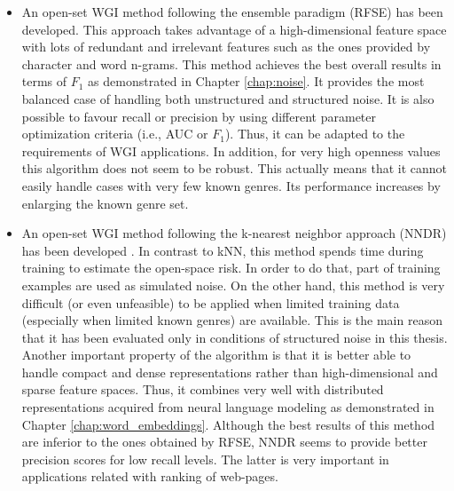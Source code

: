 \begin{itemize}
    \item An open-set WGI method following the ensemble paradigm (RFSE) has been developed. This approach takes advantage of a high-dimensional feature space with lots of redundant and irrelevant features such as the ones provided by character and word n-grams. This method achieves the best overall results in terms of $F_1$ as demonstrated in Chapter \ref{chap:noise}. It provides the most balanced case of handling both unstructured and structured noise. It is also possible to favour recall or precision by using different parameter optimization criteria (i.e., AUC or $F_1$). Thus, it can be adapted to the requirements of WGI applications. In addition, for very high openness values this algorithm does not seem to be robust. This actually means that it cannot easily handle cases with very few known genres. Its performance increases by enlarging the known genre set. 
    \item An open-set WGI method following the k-nearest neighbor approach (NNDR) has been developed . In contrast to kNN, this method spends time during training to estimate the open-space risk. In order to do that, part of training examples are used as simulated noise. On the other hand, this method is very difficult (or even unfeasible) to be applied when limited training data (especially when limited known genres) are available. This is the main reason that it has been evaluated only in conditions of structured noise in this thesis. Another important property of the algorithm is that it is better able to handle compact and dense representations rather than high-dimensional and sparse feature spaces. Thus, it combines very well with distributed representations acquired from neural language modeling as demonstrated in Chapter \ref{chap:word_embeddings}. Although the best results of this method are inferior to the ones obtained by RFSE, NNDR seems to provide better precision scores for low recall levels. The latter is very important in applications related with ranking of web-pages.

\end{itemize}
